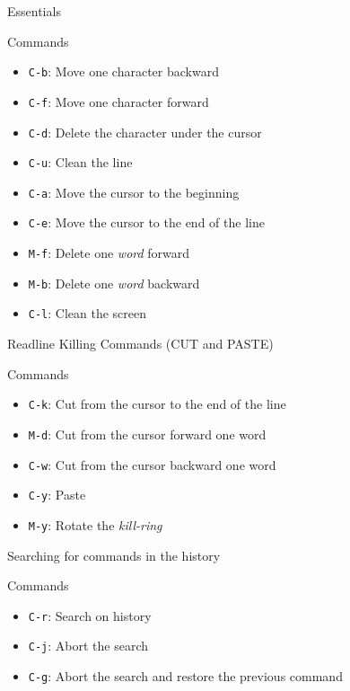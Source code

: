 \documentclass[10pt, compress, aspectratio=169]{beamer}
\begin{document}
\begin{frame}{Essentials}
  \begin{exampleblock}{Commands}
    \begin{itemize}
      \item \texttt{C-b}: Move one character backward
      \item \texttt{C-f}: Move one character forward
      \item \texttt{C-d}: Delete the character under the cursor
      \item \texttt{C-u}: Clean the line
      \item \texttt{C-a}: Move the cursor to the beginning
      \item \texttt{C-e}: Move the cursor to the end of the line
      \item \texttt{M-f}: Delete one \textit{word} forward
      \item \texttt{M-b}: Delete one \textit{word} backward
      \item \texttt{C-l}: Clean the screen
    \end{itemize}
  \end{exampleblock}
\end{frame}

\begin{frame}{Readline Killing Commands (CUT and PASTE)}
  \begin{exampleblock}{Commands}
    \begin{itemize}
      \item \texttt{C-k}: Cut from the cursor to the end of the line
      \item \texttt{M-d}: Cut from the cursor forward one word
      \item \texttt{C-w}: Cut from the cursor backward one word
      \item \texttt{C-y}: Paste
      \item \texttt{M-y}: Rotate the \textit{kill-ring}
    \end{itemize}
  \end{exampleblock}
\end{frame}

\begin{frame}{Searching for commands in the history}
  \begin{exampleblock}{Commands}
    \begin{itemize}
      \item \texttt{C-r}: Search on history
      \item \texttt{C-j}: Abort the search
      \item \texttt{C-g}: Abort the search and restore the previous command
    \end{itemize}
  \end{exampleblock}
\end{frame}
\end{document}
